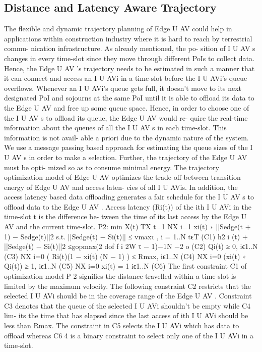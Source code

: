 \documentclass{article}
\begin{document}
\begin{multicols}{2}
\section{Distance and Latency Aware Trajectory}
The flexible and dynamic trajectory planning of
Edge U AV could help in applications within construction
industry where it is hard to reach by terrestrial commu-
nication infrastructure. As already mentioned, the po-
sition of I U AV s changes in every time-slot since they
move through different PoIs to collect data. Hence, the
Edge U AV ’s trajectory needs to be estimated in such a
manner that it can connect and access an I U AVi in a
time-slot before the I U AVi’s queue overflows. Whenever
an I U AVi’s queue gets full, it doesn’t move to its next
designated PoI and sojourns at the same PoI until it is
able to offload its data to the Edge U AV and free up
some queue space. Hence, in order to choose one of the
I U AV s to offload its queue, the Edge U AV would re-
quire the real-time information about the queues of all the
I U AV s in each time-slot. This information is not avail-
able a priori due to the dynamic nature of the system. We
use a message passing based approach for estimating the
queue sizes of the I U AV s in order to make a selection.
Further, the trajectory of the Edge U AV must be opti-
mized so as to consume minimal energy. The trajectory
optimization model of Edge U AV optimizes the trade-off
between transition energy of Edge U AV and access laten-
cies of all I U AVis. In addition, the access latency based
data offloading generates a fair schedule for the I U AV s
to offload data to the Edge U AV . Access latency (Ri(t))
of the ith I U AVi in the time-slot t is the difference be-
tween the time of its last access by the Edge U AV and
the current time-slot.
P2: min
X(t)
TX
t=1
NX
i=1
xi(t) ∗ ||Sedge(t + 1) − Sedge(t)||2
s.t.
||Sedge(t) − Si(t)|| ≤ vmaxτ , i = {1..N } tϵT (C1)
h2
i (t) + ||Sedge(t) − Si(t)||2 ≤gopmax(2 dof f
i
2W τ − 1)−1N −2
o (C2)
Qi(t) ≥ 0, iϵ{1..N }(C3)
NX
i=0
( Ri(t)(1 − xi(t)
(N − 1) ) ≤ Rmax, iϵ{1..N }(C4)
NX
i=0
(xi(t) ∗ Qi(t)) ≥ 1, iϵ{1..N }(C5)
NX
i=0
xi(t) = 1 iϵ1..N (C6)
The first constraint C1 of optimization model P 2 signifies
the distance travelled within a time-slot is limited by the
maximum velocity. The following constraint C2 restricts
that the selected I U AVi should be in the coverage range
of the Edge U AV . Constraint C3 denotes that the queue
of the selected I U AVi shouldn’t be empty while C4 lim-
its the time that has elapsed since the last access of ith
I U AVi should be less than Rmax. The constraint in C5
selects the I U AVi which has data to offload whereas C6
4
is a binary constraint to select only one of the I U AVi in
a time-slot.


\end{multicols}
\end{document}
